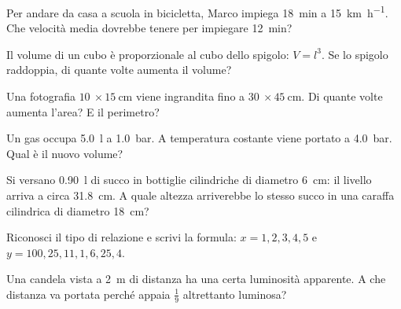 \begin{esercizio}
Per andare da casa a scuola in bicicletta, Marco impiega \SI{18}{\minute} a \SI{15}{\kilo\metre\per\hour}. Che velocità media dovrebbe tenere per impiegare \SI{12}{\minute}?\\
\end{esercizio}

\begin{esercizio}
Il volume di un cubo è proporzionale al cubo dello spigolo: $V = l^3$. Se lo spigolo raddoppia, di quante volte aumenta il volume?\\
\end{esercizio}

\begin{esercizio}
Una fotografia $\SI{10}{}\times\SI{15}{\centi\metre}$ viene ingrandita fino a $\SI{30}{}\times\SI{45}{\centi\metre}$. Di quante volte aumenta l'area? E il perimetro?\\
\end{esercizio}

\begin{esercizio}
Un gas occupa \SI{5,0}{\litre} a \SI{1,0}{\bar}. A temperatura costante viene portato a \SI{4,0}{\bar}. Qual è il nuovo volume?\\
\end{esercizio}

\begin{esercizio}
Si versano \SI{0,90}{\litre} di succo in bottiglie cilindriche di diametro \SI{6}{\centi\metre}: il livello arriva a circa \SI{31,8}{\centi\metre}. A quale altezza arriverebbe lo stesso succo in una caraffa cilindrica di diametro \SI{18}{\centi\metre}?\\
\end{esercizio}

\begin{esercizio}
Riconosci il tipo di relazione e scrivi la formula: \; $x = 1,2,3,4,5$ \; e \; $y = 100,25,11{,}1,6{,}25,4$.\\
\end{esercizio}

\begin{esercizio}
Una candela vista a \SI{2}{\metre} di distanza ha una certa luminosità apparente. A che distanza va portata perché appaia $\tfrac{1}{9}$ altrettanto luminosa?\\
\end{esercizio}

